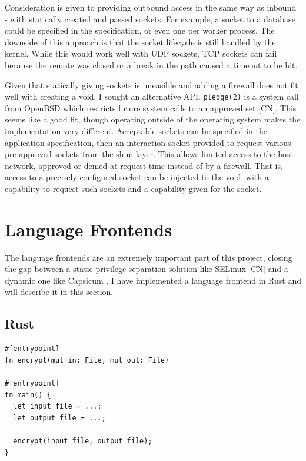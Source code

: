 \documentclass[sigplan]{acmart}
\begin{document}
Consideration is given to providing outbound access in the same way as inbound - with statically created and passed sockets. For example, a socket to a database could be specified in the specification, or even one per worker process. The downside of this approach is that the socket lifecycle is still handled by the kernel. While this would work well with UDP sockets, TCP sockets can fail because the remote was closed or a break in the path caused a timeout to be hit.

Given that statically giving sockets is infeasible and adding a firewall does not fit well with creating a void, I sought an alternative API. \texttt{pledge(2)} is a system call from OpenBSD which restricts future system calls to an approved set [CN]. This seems like a good fit, though operating outside of the operating system makes the implementation very different. Acceptable sockets can be specified in the application specification, then an interaction socket provided to request various pre-approved sockets from the shim layer. This allows limited access to the host network, approved or denied at request time instead of by a firewall. That is, access to a precisely configured socket can be injected to the void, with a capability to request such sockets and a capability given for the socket.


\iffalse %

\section{Language Frontends}

The language frontends are an extremely important part of this project, closing the gap between a static privilege separation solution like SELinux [CN] and a dynamic one like Capsicum \citep{watson_capsicum_2010}. I have implemented a language frontend in Rust and will describe it in this section.

\subsection{Rust}

\begin{lstlisting}[float,label={lst:rust-language-frontend}]
#[entrypoint]
fn encrypt(mut in: File, mut out: File)

#[entrypoint]
fn main() {
  let input_file = ...;
  let output_file = ...;
  
  encrypt(input_file, output_file);
}
\end{lstlisting}
\end{document}
